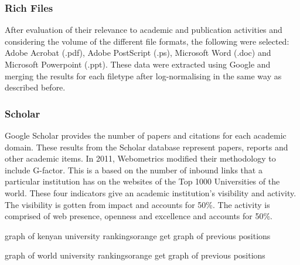 \subsubsection{Rich Files}
\noindent
After evaluation of their relevance to academic and publication activities and considering the volume of the different file formats, the following were selected: Adobe Acrobat (.pdf), Adobe PostScript (.ps), Microsoft Word (.doc) and Microsoft Powerpoint (.ppt). These data were extracted using Google and merging the results for each 
filetype after log-normalising in the same way as described before.
\subsubsection{Scholar}
\noindent
Google Scholar provides the number of papers and citations for each academic domain. These results from the Scholar database represent papers, reports and other academic items.
In 2011, Webometrics modified their methodology to include G-factor. This is a based on the number of inbound links that a particular institution has on the websites of the Top 1000 Universities of the world.
These four indicators give an academic institution’s visibility and activity. The visibility is gotten from
impact and accounts for 50\%. The activity is comprised of web presence, openness and excellence
and accounts for 50\%.

\begin{review_comment}{graph of kenyan university rankings}{orange}
{get graph of previous positions}
\end{review_comment}

\begin{review_comment}{graph of world university rankings}{orange}
{get graph of previous positions}
\end{review_comment}



